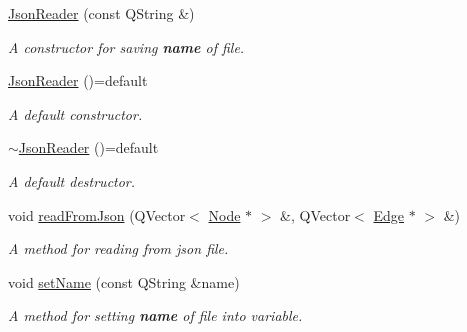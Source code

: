 \begin{DoxyCompactItemize}
\item 
\mbox{\label{class_json_reader_a4ac891f187e7a67c657209d7f5d0ece4}} 
\mbox{\hyperlink{class_json_reader_a4ac891f187e7a67c657209d7f5d0ece4}{Json\+Reader}} (const Q\+String \&)
\begin{DoxyCompactList}\small\item\em A {\itshape constructor} for saving {\bfseries{name}} of file. \end{DoxyCompactList}\item 
\mbox{\label{class_json_reader_a2858c4667713bdf694aa221429c7cee4}} 
\mbox{\hyperlink{class_json_reader_a2858c4667713bdf694aa221429c7cee4}{Json\+Reader}} ()=default
\begin{DoxyCompactList}\small\item\em A default {\itshape constructor}. \end{DoxyCompactList}\item 
\mbox{\label{class_json_reader_a0b479218111fa51708bbbcbc8f2f9889}} 
\mbox{\hyperlink{class_json_reader_a0b479218111fa51708bbbcbc8f2f9889}{$\sim$\+Json\+Reader}} ()=default
\begin{DoxyCompactList}\small\item\em A default {\itshape destructor}. \end{DoxyCompactList}\item 
\mbox{\label{class_json_reader_a0c451bc400579761d6b09736ac4da876}} 
void \mbox{\hyperlink{class_json_reader_a0c451bc400579761d6b09736ac4da876}{read\+From\+Json}} (Q\+Vector$<$ \mbox{\hyperlink{class_node}{Node}} $\ast$ $>$ \&, Q\+Vector$<$ \mbox{\hyperlink{class_edge}{Edge}} $\ast$ $>$ \&)
\begin{DoxyCompactList}\small\item\em A {\itshape method} for reading from {\itshape json} {\itshape file}. \end{DoxyCompactList}\item 
\mbox{\label{class_json_reader_a753044f73df70aaaecea4da4ae17973e}} 
void \mbox{\hyperlink{class_json_reader_a753044f73df70aaaecea4da4ae17973e}{set\+Name}} (const Q\+String \&name)
\begin{DoxyCompactList}\small\item\em A method for setting {\bfseries{name}} of file into variable. \end{DoxyCompactList}\end{DoxyCompactItemize}
